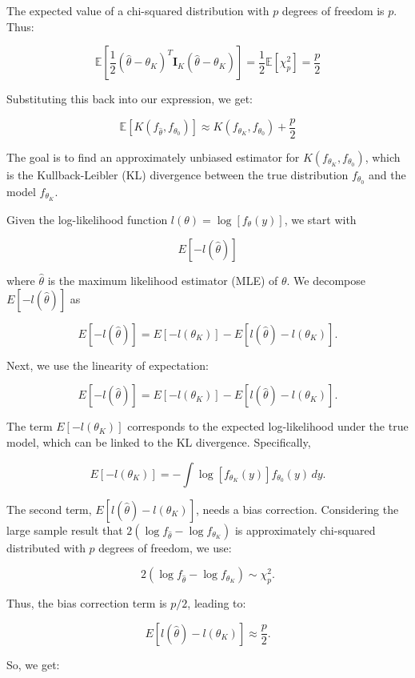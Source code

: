 \documentclass[
11pt, %
oneside, %
english, %
singlespacing, %
]{macthesis} %
\begin{document}
The expected value of a chi-squared distribution with \(p\) degrees of freedom is \(p\). Thus:

\[
\mathbb{E}\left[\frac{1}{2} (\hat{\theta} - \theta_K)^T \mathbf{I}_K (\hat{\theta} - \theta_K)\right] = \frac{1}{2} \mathbb{E}[\chi^2_p] = \frac{p}{2}
\]

Substituting this back into our expression, we get:

\begin{equation}
\mathbb{E}[K(f_{\hat{\theta}}, f_{\theta_0})] \approx K(f_{\theta_K}, f_{\theta_0}) + \frac{p}{2} 
\label{eq:KL approx}
\end{equation}

The goal is to find an approximately unbiased estimator for \(K(f_{\theta_K}, f_{\theta_0})\), which is the Kullback-Leibler (KL) divergence between the true distribution \(f_{\theta_0}\) and the model \(f_{\theta_K}\).

Given the log-likelihood function \(l(\theta) = \log[f_{\theta}(y)]\), we start with

\[
E[-l(\hat{\theta})]
\]

where \(\hat{\theta}\) is the maximum likelihood estimator (MLE) of \(\theta\). We decompose \(E[-l(\hat{\theta})]\) as

\[
E[-l(\hat{\theta})] = E[-l(\theta_K)] - E[l(\hat{\theta}) - l(\theta_K)].
\]

Next, we use the linearity of expectation:

\[
E[-l(\hat{\theta})] = E[-l(\theta_K)] - E[l(\hat{\theta}) - l(\theta_K)]. 
\]

The term \(E[-l(\theta_K)]\) corresponds to the expected log-likelihood under the true model, which can be linked to the KL divergence. Specifically,

\[
E[-l(\theta_K)] = -\int \log[f_{\theta_K}(y)] f_{\theta_0}(y) \, dy. 
\]

The second term, \(E[l(\hat{\theta}) - l(\theta_K)]\), needs a bias correction. Considering the large sample result that \(2 (\log f_{\hat{\theta}} - \log f_{\theta_K})\) is approximately chi-squared distributed with \(p\) degrees of freedom, we use:

\[
2 (\log f_{\hat{\theta}} - \log f_{\theta_K}) \sim \chi^2_p.
\]

Thus, the bias correction term is \(p/2\), leading to:

\[
E[l(\hat{\theta}) - l(\theta_K)] \approx \frac{p}{2}. 
\]

So, we get:
\end{document}
